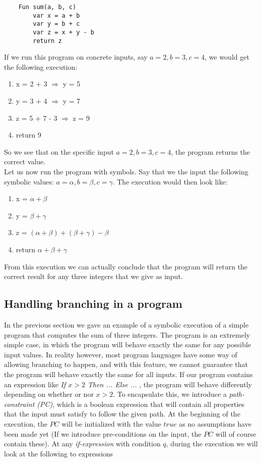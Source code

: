 	\begin{lstlisting}
	Fun sum(a, b, c) 
		var x = a + b
		var y = b + c
		var z = x + y - b
		return z
	\end{lstlisting} 
	
	If we run this program on concrete inputs, say $a = 2, b = 3, c = 4$, we would get the following execution:
	
	\begin{enumerate} 
		\item x = 2 + 3 $\Rightarrow$ y = 5
		\item y = 3 + 4 $\Rightarrow$ y = 7
		\item z = 5 + 7 - 3 $\Rightarrow$ z = 9
		\item return 9
	\end{enumerate}
	
	So we see that on the specific input $a = 2, b = 3, c = 4$, the program returns the correct value.
	\\
	Let us now run the program with symbols. Say that we the input the following symbolic values: $a = \alpha, b = \beta, c = \gamma$.
	The execution would then look like:
	
	\begin{enumerate}
		\item x = $\alpha + \beta$
		\item y = $\beta  + \gamma$
		\item z = $(\alpha + \beta) + (\beta + \gamma) - \beta$
		\item return $\alpha + \beta + \gamma$
	\end{enumerate}
	
	From this execution we can actually conclude that the program will return the correct result for any three integers that we give as input. 
	
	\subsection{Handling branching in a program}
		In the previous section we gave an example of a symbolic execution of a simple program that computes the sum of three integers. The program is an extremely simple case, in which the program will behave exactly the same for any possible input values. In reality however, most program languages have some way of allowing branching to happen, and with this feature, we cannot guarantee that the program will behave exactly the same for all inputs. If our program contains an expression like \emph{If $x > 2$ Then ... Else ... }, the program will behave differently depending on whether or nor $x > 2$. To encapsulate this, we introduce a \emph{path-constraint (PC)}, which is a boolean expression that will contain all properties that the input must satisfy to follow the given path. At the beginning of the execution, the $PC$ will be initialized with the value $true$ as no assumptions have been made yet (If we introduce pre-conditions on the input, the $PC$ will of course contain these). 
		At any \emph{if-expression} with condition $q$, during the execution we will look at the following to expressions
		

